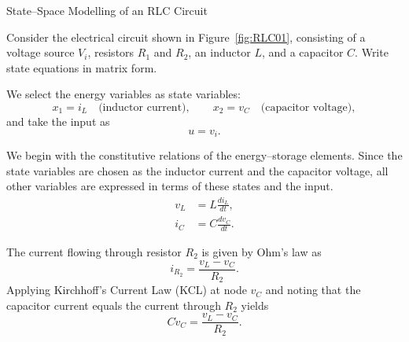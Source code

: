 \begin{examplebox}{State--Space Modelling of an RLC Circuit}
	
	Consider the electrical circuit shown in Figure~\ref{fig:RLC01}, consisting of a voltage source $V_i$, resistors $R_1$ and $R_2$, an inductor $L$, and a capacitor $C$. Write state equations in matrix form.
		\begin{center}
		\label{fig:RLC01}
	\end{center}
	
	\medskip
	\solution
	We select the energy variables as state variables:
	\[
	x_1 = i_L \quad \text{(inductor current)}, 
	\qquad 
	x_2 = v_C \quad \text{(capacitor voltage)},
	\]
	and take the input as
	\[
	u = v_i .
	\]
	
We begin with the constitutive relations of the energy–storage elements. 
Since the state variables are chosen as the inductor current and the capacitor voltage, all other variables are expressed in terms of these states and the input.
\begin{align}
	v_L &= L \frac{d i_L}{dt}, \\
	i_C &= C \frac{d v_C}{dt}.
\end{align}

The current flowing through resistor $R_2$ is given by Ohm’s law as
\[
i_{R_2} = \frac{v_L - v_C}{R_2}.
\]
Applying Kirchhoff’s Current Law (KCL) at node $v_C$ and noting that the capacitor current equals the current through $R_2$ yields
\[
C \dot{v}_C = \frac{v_L - v_C}{R_2}.
\]
	

\end{examplebox}

